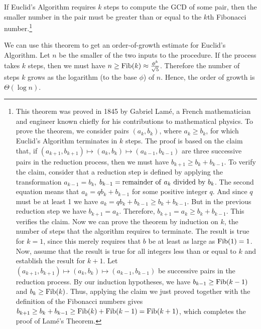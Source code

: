 \begin{theorem}
  If Euclid's Algorithm requires $k$ steps to compute the GCD of some
  pair, then the smaller number in the pair must be greater than or
  equal to the $k$th Fibonacci number.\footnote{This theorem was
    proved in 1845 by Gabriel Lam\'e, a French mathematician and
    engineer known chiefly for his contributions to mathematical
    physics.  To prove the theorem, we consider pairs $(a_{k}
    ,b_{k})$, where $a_k \ge b_k$, for which Euclid's Algorithm
    terminates in $k$ steps.  The proof is based on the claim that, if
    $(a_{k+1}, b_{k+1}) \mapsto (a_k, b_k) \mapsto (a_{k-1},
    b_{k-1})$ are three successive pairs in the reduction process,
    then we must have $b_{k+1} \ge b_k + b_{k-1}$.  To verify the
    claim, consider that a reduction step is defined by applying the
    transformation $a_{k-1} = b_k$, $b_{k-1} = {\rm remainder~of~} a_k
    {\rm ~divided~by~} b_k$.  The second equation means that $a_k =
    qb_k + b_{k-1}$ for some positive integer $q$.  And since $q$ must
    be at least 1 we have $a_k = qb_k + b_{k-1} \ge b_k + b_{k-1}$.
    But in the previous reduction step we have $b_{k+1} = a_k$.
    Therefore, $b_{k+1} = a_k \ge b_k + b_{k-1}$.  This verifies the
    claim.  Now we can prove the theorem by induction on $k$, the
    number of steps that the algorithm requires to terminate.  The
    result is true for $k = 1$, since this merely requires that $b$ be
    at least as large as ${\rm Fib}(1) = 1$.  Now, assume that the
    result is true for all integers less than or equal to $k$ and
    establish the result for $k + 1$.  Let $(a_{k+1}, b_{k+1})
    \mapsto (a_k, b_k) \mapsto (a_{k-1}, b_{k-1})$ be
    successive pairs in the reduction process.  By our induction
    hypotheses, we have $b_{k-1} \ge {\rm Fib}(k - 1)$ and $b_k \ge
    {\rm Fib}(k)$.  Thus, applying the claim we just proved together
    with the definition of the Fibonacci numbers gives $b_{k+1} \ge
    b_k + b_{k-1} \ge {\rm Fib}(k) + {\rm Fib}(k - 1) = {\rm
      Fib}(k+1)$, which completes the proof of Lam\'e's Theorem.}
\end{theorem}



We can use this theorem to get an order-of-growth estimate for Euclid's
Algorithm.  Let $n$ be the smaller of the two inputs to the
procedure.  If the process takes $k$ steps, then we must have 
$n \ge {\rm Fib}(k) \approx \frac{\phi^k}{\sqrt 5}$.  Therefore
the number of steps $k$ grows as the logarithm (to the base
$\phi$) of $n$.  Hence, the order of growth is $\Theta(\log n)$.

